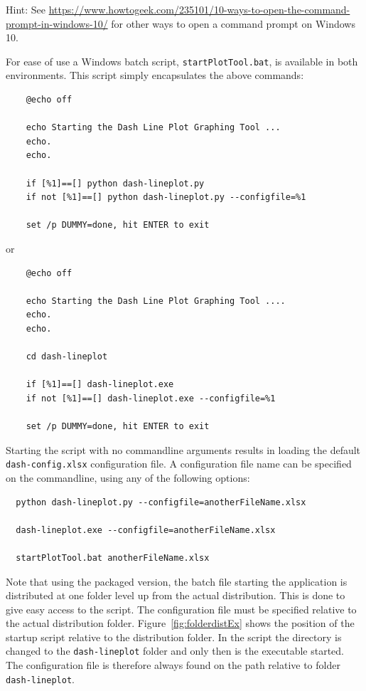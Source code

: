 Hint: See 
\footnotesize
\url{https://www.howtogeek.com/235101/10-ways-to-open-the-command-prompt-in-windows-10/} \normalsize
for other ways to open a command prompt on Windows 10.

For ease of use a Windows batch script, \texttt{startPlotTool.bat}, is available in both environments. This script simply encapsulates the above commands:

\footnotesize
\begin{lstlisting}
    @echo off

    echo Starting the Dash Line Plot Graphing Tool ...
    echo.
    echo.

    if [%1]==[] python dash-lineplot.py
    if not [%1]==[] python dash-lineplot.py --configfile=%1

    set /p DUMMY=done, hit ENTER to exit
\end{lstlisting}
\normalsize

or

\footnotesize
\begin{lstlisting}
    @echo off

    echo Starting the Dash Line Plot Graphing Tool ....
    echo.
    echo.

    cd dash-lineplot

    if [%1]==[] dash-lineplot.exe
    if not [%1]==[] dash-lineplot.exe --configfile=%1

    set /p DUMMY=done, hit ENTER to exit
\end{lstlisting}
\normalsize


Starting the script with no commandline arguments results in loading the default \texttt{dash-config.xlsx} configuration file. A configuration file name can be specified on the commandline, using any of the following options:

\footnotesize
\begin{lstlisting}
  python dash-lineplot.py --configfile=anotherFileName.xlsx

  dash-lineplot.exe --configfile=anotherFileName.xlsx
  
  startPlotTool.bat anotherFileName.xlsx

\end{lstlisting}
\normalsize

Note that using the packaged version, the batch file starting the application is distributed at one folder level up from the actual distribution. This is done to give easy access to the script. The configuration file must be specified relative to the actual distribution folder. Figure~\ref{fig:folderdistEx} shows the position of the startup script relative to the distribution folder. In the script the directory is changed to the \texttt{dash-lineplot} folder and only then is the executable started. The configuration file is therefore always found on the path relative to folder \texttt{dash-lineplot}.

